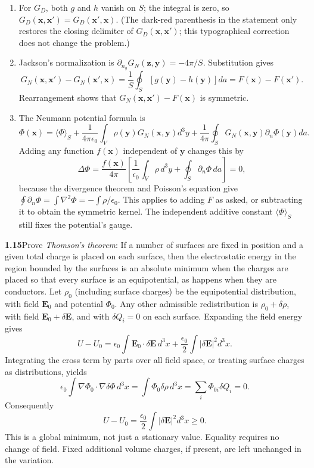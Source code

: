 \begin{enumerate}
\item[(a)] For $G_D$, both $g$ and $h$ vanish on $S$; the integral is zero, so
$G_D(\mathbf x,\mathbf x')=G_D(\mathbf x',\mathbf x)$. (The dark-red parenthesis in the
statement only restores the closing delimiter of $G_D(\mathbf x,\mathbf x')$; this
typographical correction does not change the problem.)
\item[(b)] Jackson's normalization is
$\partial_{n_y}G_N(\mathbf z,\mathbf y)=-4\pi/S$. Substitution gives
\[
G_N(\mathbf x,\mathbf x')-G_N(\mathbf x',\mathbf x)
=\frac1S\oint_S[g(\mathbf y)-h(\mathbf y)]da
=F(\mathbf x)-F(\mathbf x').
\]
Rearrangement shows that $G_N(\mathbf x,\mathbf x')-F(\mathbf x)$ is symmetric.
\item[(c)] The Neumann potential formula is
\[
\Phi(\mathbf x)=\langle\Phi\rangle_S+
\frac1{4\pi\epsilon_0}\int_V\rho(\mathbf y)G_N(\mathbf x,\mathbf y)d^3y
+\frac1{4\pi}\oint_SG_N(\mathbf x,\mathbf y)\partial_n\Phi(\mathbf y)da.
\]
Adding any function $f(\mathbf x)$ independent of $\mathbf y$ changes this by
\[
\Delta\Phi=\frac{f(\mathbf x)}{4\pi}
\left[\frac1{\epsilon_0}\int_V\rho\,d^3y+\oint_S\partial_n\Phi\,da\right]=0,
\]
because the divergence theorem and Poisson's equation give
$\oint\partial_n\Phi=\int\nabla^2\Phi=-\int\rho/\epsilon_0$.
This applies to adding $F$ as asked, or subtracting it to obtain the symmetric
kernel. The independent additive constant $\langle\Phi\rangle_S$ still fixes
the potential's gauge.
\end{enumerate}


\par\bigskip
\noindent\textbf{1.15}\quad Prove \emph{Thomson's theorem}: If a number of surfaces are fixed in position and a given total charge is placed on each surface, then the electrostatic energy in the region bounded by the surfaces is an absolute minimum when the charges are placed so that every surface is an equipotential, as happens when they are conductors.
\solution
Let $\rho_0$ (including surface charges) be the equipotential distribution,
with field $\mathbf E_0$ and potential $\Phi_0$. Any other admissible
redistribution is $\rho_0+\delta\rho$, with field
$\mathbf E_0+\delta\mathbf E$, and with $\delta Q_i=0$ on each surface.
Expanding the field energy gives
\[
U-U_0=\epsilon_0\int\mathbf E_0\cdot\delta\mathbf E\,d^3x
+\frac{\epsilon_0}{2}\int|\delta\mathbf E|^2d^3x.
\]
Integrating the cross term by parts over all field space, or treating surface
charges as distributions, yields
\[
\epsilon_0\int\nabla\Phi_0\cdot\nabla\delta\Phi\,d^3x
=\int\Phi_0\delta\rho\,d^3x
=\sum_i\Phi_{0i}\delta Q_i=0.
\]
Consequently
\[
\boxed{U-U_0=\frac{\epsilon_0}{2}\int|\delta\mathbf E|^2d^3x\ge0.}
\]
This is a global minimum, not just a stationary value. Equality requires no
change of field. Fixed additional volume charges, if present, are left
unchanged in the variation.


